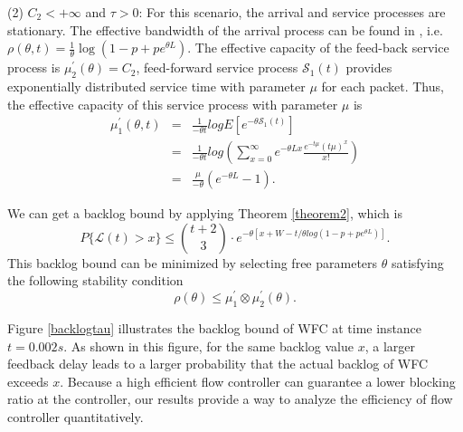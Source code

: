 \documentclass[12pt]{article}
\begin{document}
(2) $C_2<+\infty$ and $\tau> 0$: For this scenario, the arrival and service processes are stationary. The effective bandwidth of the arrival process can be found in \cite{Chan94}, i.e. $\rho(\theta,t)=\frac{1}{\theta}\log(1-p+pe^{\theta L})$. The effective capacity of the feed-back service process is $\mu_2^\prime(\theta)=C_2$, feed-forward service process $\mathcal{S}_1(t)$ provides exponentially distributed service time with parameter $\mu$ for each packet. Thus, the effective capacity of this service process with parameter $\mu$ is
\begin{eqnarray*}
\mu_1^\prime(\theta,t)&=& \frac{1}{-\theta t}log E[e^{-\theta \mathcal{S}_1(t)}]\\
&=& \frac{1}{-\theta t}log(\sum_{x=0}^\infty e^{-\theta Lx}\frac{e^{-t\mu}(t\mu)^x}{x!})\\
&=& \frac{\mu}{-\theta}(e^{-\theta L}-1).
\end{eqnarray*}

We can get a backlog bound by applying Theorem \ref{theorem2}, which is
\begin{equation}\label{bernoullibound}
P\{\mathcal{L}(t)>x\}\leq {t+2\choose 3}\cdot e^{-\theta [x+W-t/\theta log(1-p+pe^{\theta L})]}.
\end{equation}
This backlog bound can be minimized by selecting free parameters $\theta$ satisfying the following stability condition
\begin{equation}\label{stabilitycond3}
\rho(\theta)\leq \mu_1^\prime\otimes\mu_2^\prime(\theta).
\end{equation}

Figure \ref{backlogtau} illustrates the backlog bound of WFC at time instance $t=0.002s$. As shown in this figure, for the same backlog value $x$, a larger feedback delay leads to a larger probability that the actual backlog of WFC exceeds $x$. Because a high efficient flow controller can guarantee a lower blocking ratio at the controller, our results  provide a way to analyze the efficiency of flow controller quantitatively.
\end{document}
